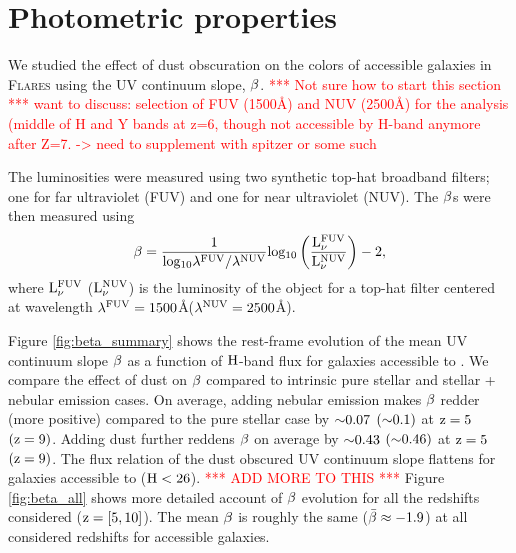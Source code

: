 
\section{Photometric properties}\label{sec:phot}

We studied the effect of dust obscuration on the colors of \euclid \: accessible galaxies in \textsc{Flares} using the UV continuum slope, $\rm \beta$.  \textcolor{red}{*** Not sure how to start this section *** want to discuss: selection of FUV (1500Å) and NUV (2500Å) for the analysis (middle of H and Y bands at z=6, though not accessible by H-band anymore after Z=7. -> need to supplement with spitzer or some such}

The luminosities were measured using two synthetic top-hat broadband filters; one for far ultraviolet (FUV) and one for near ultraviolet (NUV). The $\rm \beta$s were then measured using
\begin{equation}
\centering
    \mathrm{\beta = \frac{1}{log_{10}{\lambda^{FUV} / \lambda^{NUV}}} log_{10} \left ( \frac{L_{\nu}^{FUV}}{L_{\nu}^{NUV}} \right )  - 2  },
    \label{eqn:beta}
\end{equation}
\noindent
where $\rm L_{\nu}^{FUV}$ ($\rm L_{\nu}^{NUV}$) is the luminosity of the object for a top-hat filter centered at wavelength $\rm \lambda^{FUV} = 1500 $\AA  ($\rm \lambda^{NUV} = 2500 $\AA).

Figure \ref{fig:beta_summary} shows the rest-frame evolution of the mean UV continuum slope $\rm \beta$ as a function of $\rm H$-band flux for galaxies accessible to \euclid. We compare the effect of dust on $\rm \beta$ compared to intrinsic pure stellar and stellar + nebular emission cases. On average, adding nebular emission makes $\rm \beta$ redder (more positive) compared to the pure stellar case by $\rm {\sim}0.07$ $(\rm {\sim}0.1)$ at $\rm z=5$ $(\rm z=9)$. Adding dust further reddens $\rm \beta$ on average by $\rm {\sim}0.43$ $(\rm {\sim}0.46)$ at $\rm z=5$ $(\rm z=9)$. The flux relation of the dust obscured UV continuum slope flattens for galaxies accessible to \euclid \: ($\rm H < 26$). \textcolor{red}{*** ADD MORE TO THIS ***} Figure \ref{fig:beta_all} shows more detailed account of $\rm \beta$ evolution for all the redshifts considered ($\rm z = [5, 10]$). The mean $\rm \beta$ is roughly the same ($\rm \Bar{\beta} \approx -1.9 $) at all considered redshifts for \euclid \: accessible galaxies.


